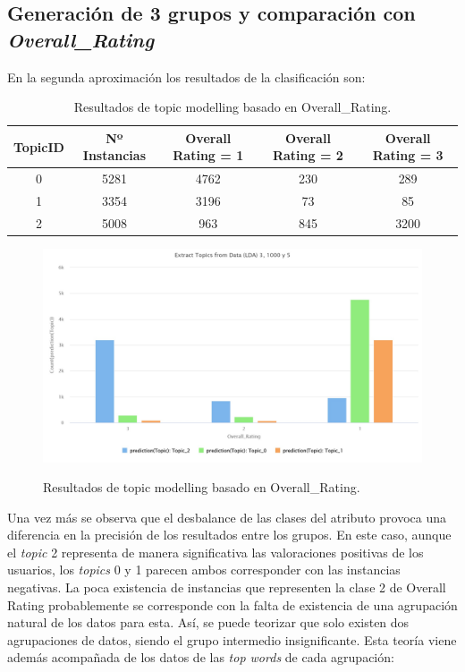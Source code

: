 \documentclass[es]{uc3mreport}
\begin{document}
\begin{report}
\subsection{Generación de 3 grupos y comparación con \textit{Overall\_Rating}}

En la segunda aproximación los resultados de la clasificación son:

\begin{table}[H]
\center
\begin{tabular}{@{}ccccc@{}}
    \toprule
    TopicID & Nº Instancias & Overall Rating = 1 & Overall Rating = 2 & Overall Rating = 3 \\
    \midrule
    0       & 5281          & 4762               & 230                & 289 \\
    1       & 3354          & 3196               & 73                 & 85  \\
    2       & 5008          & 963                & 845                & 3200\\
    \bottomrule
\end{tabular}
\caption{Resultados de topic modelling basado en Overall\_Rating.}
\end{table}

\begin{figure}[H]
    \center
    \includegraphics[width=0.85\linewidth]{graph_3topic_1000iter.jpeg}\\
    \caption{Resultados de topic modelling basado en Overall\_Rating.}
\end{figure}

Una vez más se observa que el desbalance de las clases del atributo provoca una
diferencia en la precisión de los resultados entre los grupos. En este caso,
aunque el \textit{topic} 2 representa de manera significativa las valoraciones positivas
de los usuarios, los \textit{topics} 0 y 1 parecen ambos corresponder con las instancias
negativas. La poca existencia de instancias que representen la clase 2 de
Overall Rating probablemente se corresponde con la falta de existencia de una
agrupación natural de los datos para esta. Así, se puede teorizar que solo
existen dos agrupaciones de datos, siendo el grupo intermedio insignificante.
Esta teoría viene además acompañada de los datos de las \textit{top words} de cada
agrupación:


\end{report}
\end{document}
